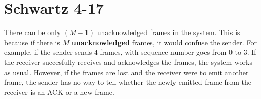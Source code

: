 \documentclass{article}
\begin{document}
\section*{Schwartz 4-17}
	There can be only $(M-1)$ unacknowledged frames in the system. This is because
	if there is $M$ \textbf{unacknowledged} frames, it would confuse the sender.
	For example, if the sender sends 4 frames, with sequence number goes from 0 to
	3. If the receiver succesfully receives and acknowledges the frames, the
	system works as usual. However, if the frames are lost and the receiver were
	to emit another frame, the sender has no way to tell whether the newly emitted
	frame from the receiver is an ACK or a new frame.
\end{document}
